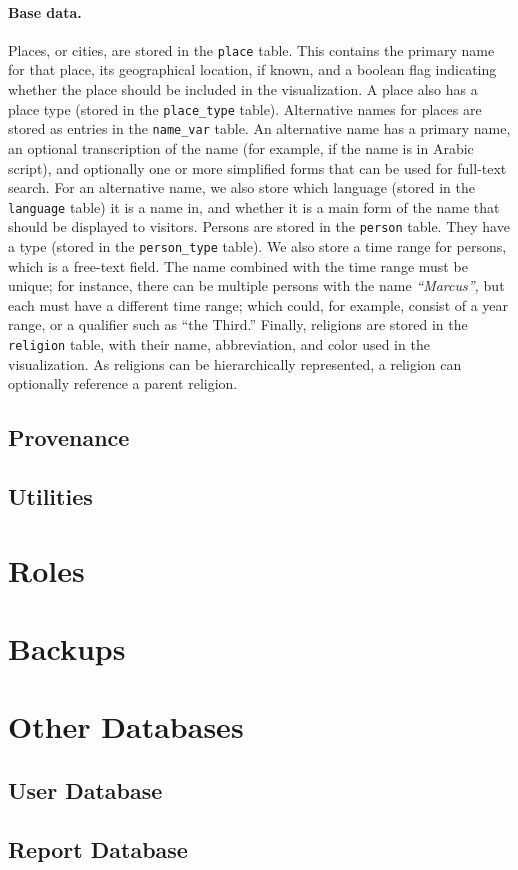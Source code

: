 \paragraph*{Base data.}
Places, or cities, are stored in the \verb!place! table.
This contains the primary name for that place, its geographical location, if known, and a boolean flag indicating whether the place should be included in the visualization.
A place also has a place type (stored in the \verb!place_type! table).
Alternative names for places are stored as entries in the \verb!name_var! table.
An alternative name has a primary name, an optional transcription of the name (for example, if the name is in Arabic script), and optionally one or more simplified forms that can be used for full-text search.
For an alternative name, we also store which language (stored in the \verb!language! table) it is a name in, and whether it is a main form of the name that should be displayed to visitors.
Persons are stored in the \verb!person! table.
They have a type (stored in the \verb!person_type! table).
We also store a time range for persons, which is a free-text field.
The name combined with the time range must be unique;
for instance, there can be multiple persons with the name \emph{\enquote{Marcus},} but each must have a different time range; which could, for example, consist of a year range, or a qualifier such as \enquote{the Third.}
Finally, religions are stored in the \verb!religion! table, with their name, abbreviation, and color used in the visualization.
As religions can be hierarchically represented, a religion can optionally reference a parent religion.


\subsection{Provenance}
\label{sec:provenance-tables}
\subsection{Utilities}
\section{Roles}
\section{Backups}
\section{Other Databases}
\subsection{User Database}
\subsection{Report Database}
